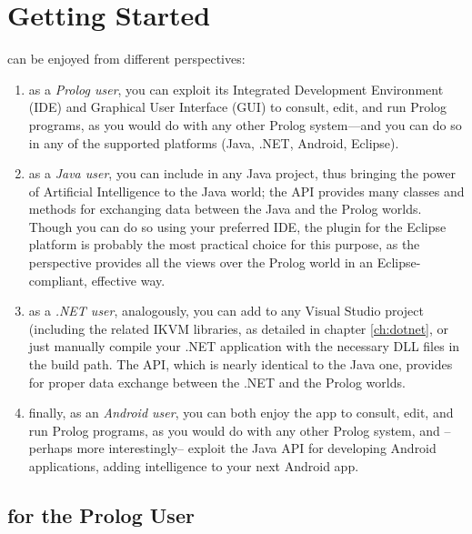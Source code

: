 \chapter{Getting Started}
\label{ch:getting-started}

\tuprolog{} can be enjoyed from different perspectives:
\begin{enumerate}
  \item as a \textit{Prolog user}, you can exploit its Integrated Development
        Environment (IDE) and Graphical User Interface (GUI) to consult, edit, and run Prolog programs, as you would do with any other Prolog system---and you can do so in any of the supported platforms (Java, .NET, Android, Eclipse).
  \item as a \textit{Java user}, you can include \tuprolog{} in any Java project,
        thus bringing the power of Artificial Intelligence to the Java world; the \tuprolog{} API provides many classes and methods for exchanging data
        between the Java and the Prolog worlds.
        Though you can do so using your preferred IDE, the \tuprolog{} plugin
        for the Eclipse platform is probably the most practical choice for this purpose, as the \tuprolog{} perspective provides all the views over the Prolog world in an Eclipse-compliant, effective way.
  \item as a \textit{.NET user}, analogously, you can add \tuprolog{} to any
        Visual Studio project (including the related IKVM libraries, as detailed in chapter \ref{ch:dotnet}, or just manually compile your .NET application with the necessary DLL files in the build path. The \tuprolog{} API, which is nearly identical to the Java one, provides for proper data exchange
        between the .NET and the Prolog worlds.
  \item finally, as an \textit{Android user}, you can both enjoy the \tuprolog{} app
        to consult, edit, and run Prolog programs, as you would do with any other Prolog system, and --perhaps more interestingly-- exploit the \tuprolog{} Java API for developing Android applications, adding intelligence to your next Android app.
\end{enumerate}

\section{\tuprolog{} for the Prolog User}
\label{sec:prolog-user-perspective}


